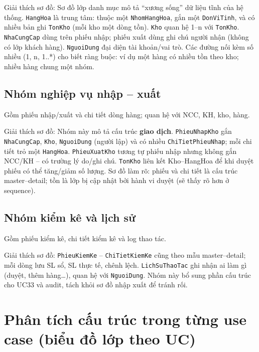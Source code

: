 Giải thích sơ đồ: Sơ đồ lớp danh mục mô tả ``xương sống'' dữ liệu tĩnh của hệ thống. \texttt{HangHoa} là trung tâm: thuộc một \texttt{NhomHangHoa}, gắn một \texttt{DonViTinh}, và có nhiều bản ghi \texttt{TonKho} (mỗi kho một dòng tồn). \texttt{Kho} quan hệ 1--n với \texttt{TonKho}. \texttt{NhaCungCap} dùng trên phiếu nhập; phiếu xuất dùng ghi chú người nhận (không có lớp khách hàng). \texttt{NguoiDung} đại diện tài khoản/vai trò. Các đường nối kèm số nhiều (1, n, 1..*) cho biết ràng buộc: ví dụ một hàng có nhiều tồn theo kho; nhiều hàng chung một nhóm.

\subsection{Nhóm nghiệp vụ nhập -- xuất}

Gồm phiếu nhập/xuất và chi tiết dòng hàng; quan hệ với NCC, KH, kho, hàng.



Giải thích sơ đồ: Nhóm này mô tả cấu trúc \textbf{giao dịch}. \texttt{PhieuNhapKho} gắn \texttt{NhaCungCap}, \texttt{Kho}, \texttt{NguoiDung} (người lập) và có nhiều \texttt{ChiTietPhieuNhap}; mỗi chi tiết trỏ một \texttt{HangHoa}. \texttt{PhieuXuatKho} tương tự phiếu nhập nhưng không gắn NCC/KH -- có trường lý do/ghi chú. \texttt{TonKho} liên kết Kho--HangHoa để khi duyệt phiếu có thể tăng/giảm số lượng. Sơ đồ làm rõ: phiếu và chi tiết là cấu trúc master--detail; tồn là lớp bị cập nhật bởi hành vi duyệt (sẽ thấy rõ hơn ở sequence).

\subsection{Nhóm kiểm kê và lịch sử}

Gồm phiếu kiểm kê, chi tiết kiểm kê và log thao tác.



Giải thích sơ đồ: \texttt{PhieuKiemKe} -- \texttt{ChiTietKiemKe} cũng theo mẫu master--detail; mỗi dòng lưu SL sổ, SL thực tế, chênh lệch. \texttt{LichSuThaoTac} ghi nhận ai làm gì (duyệt, thêm hàng\ldots), quan hệ với \texttt{NguoiDung}. Nhóm này bổ sung phần cấu trúc cho UC33 và audit, tách khỏi sơ đồ nhập xuất để tránh rối.

\section{Phân tích cấu trúc trong từng use case (biểu đồ lớp theo UC)}

